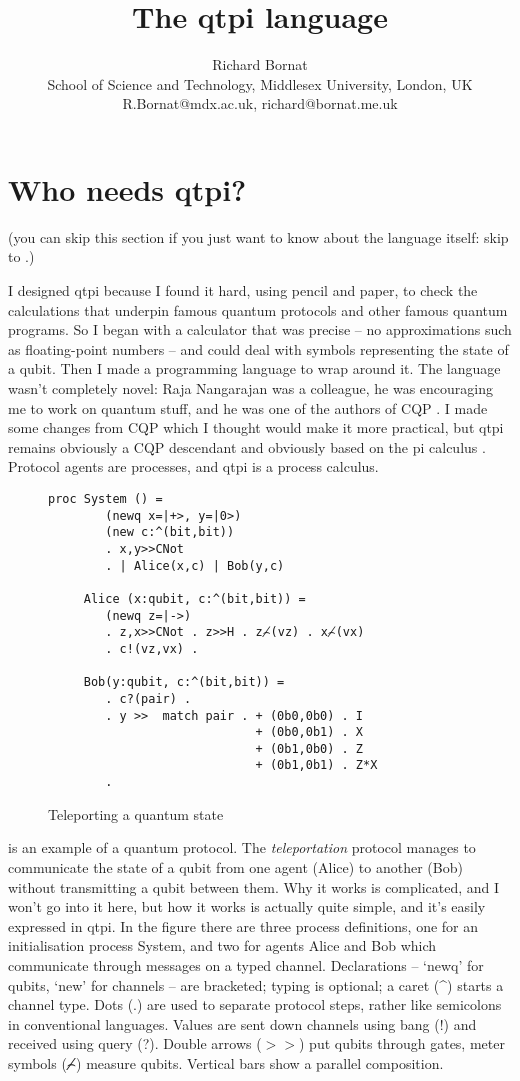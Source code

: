 \documentclass[11pt,a4paper]{article}
\title{The qtpi language}
\author{Richard Bornat \\ School of Science and Technology, Middlesex University, London, UK \\ R.Bornat@mdx.ac.uk, richard@bornat.me.uk}
\begin{document}
\newpage
\tableofcontents
\newpage
\section{Who needs qtpi?}

(you can skip this section if you just want to know about the language itself: skip to .)

I designed qtpi because I found it hard, using pencil and paper, to check the calculations that underpin famous quantum protocols and other famous quantum programs. So I began with a calculator that was precise -- no approximations such as floating-point numbers -- and could deal with symbols representing the state of a qubit. Then I made a programming language to wrap around it. The language wasn't completely novel: Raja Nangarajan was a colleague, he was encouraging me to work on quantum stuff, and he was one of the authors of CQP \citep{GaySJ:comqp}. I made some changes from CQP which I thought would make it more practical, but qtpi remains obviously a CQP descendant and obviously based on the pi calculus \citep{DBLP:journals/iandc/MilnerPW92a}. Protocol agents are processes, and qtpi is a process calculus. 

\begin{figure}
\centering
\begin{verbatim}
proc System () = 
        (newq x=|+>, y=|0>)  
        (new c:^(bit,bit))
        . x,y>>CNot 
        . | Alice(x,c) | Bob(y,c)

     Alice (x:qubit, c:^(bit,bit)) = 
        (newq z=|->) 
        . z,x>>CNot . z>>H . z⌢̸(vz) . x⌢̸(vx)
        . c!(vz,vx) .  

     Bob(y:qubit, c:^(bit,bit)) = 
        . c?(pair) . 
        . y >>  match pair . + (0b0,0b0) . I
                             + (0b0,0b1) . X
                             + (0b1,0b0) . Z
                             + (0b1,0b1) . Z*X 
        . 
\end{verbatim}
\caption{Teleporting a quantum state}
\end{figure}

 is an example of a quantum protocol. The \emph{teleportation} protocol \citep{bbcjp:93}\citep{teleportwiki} manages to communicate the state of a qubit from one agent (Alice) to another (Bob) without transmitting a qubit between them. Why it works is complicated, and I won't go into it here, but how it works is actually quite simple, and it's easily expressed in qtpi. In the figure there are three process definitions, one for an initialisation process System, and two for agents Alice and Bob which communicate through messages on a typed channel. Declarations -- `newq' for qubits, `new' for channels -- are bracketed; typing is optional; a caret (\^{}) starts a channel type. Dots (.) are used to separate protocol steps, rather like semicolons in conventional languages. Values are sent down channels using bang (!) and received using query (?). Double arrows ($>\!>$) put qubits through gates, meter symbols (⌢̸) measure qubits. Vertical bars show a parallel composition. 
\end{document}
